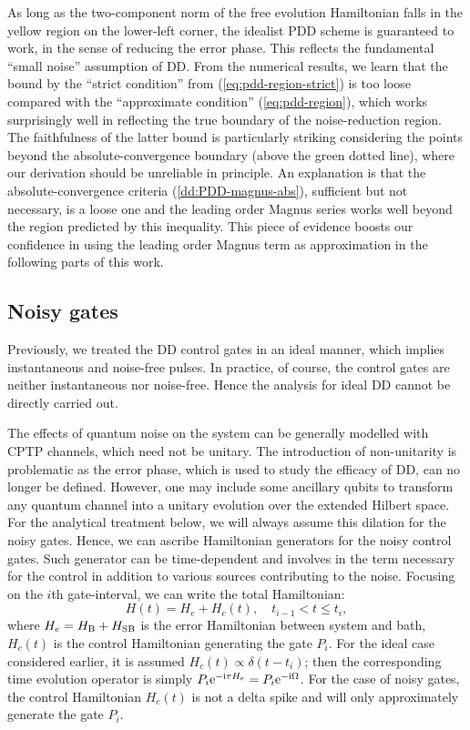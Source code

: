\documentclass[pra,reprint,superscriptaddress]{revtex4-2}
\begin{document}
{As long as the two-component norm of the free evolution Hamiltonian falls in the yellow region on the lower-left corner, the idealist PDD scheme is guaranteed to work, in the sense of reducing the error phase. This reflects the fundamental ``small noise'' assumption of DD. From the numerical results, we learn that the bound by the ``strict condition'' from (\ref{eq:pdd-region-strict}) is too loose compared with the ``approximate condition'' (\ref{eq:pdd-region}), which works surprisingly well in reflecting the true boundary of the noise-reduction region. The faithfulness of the latter bound is particularly striking considering the points beyond the absolute-convergence boundary (above the green dotted line), where our derivation should be unreliable in principle. An explanation is that the absolute-convergence criteria (\ref{dd:PDD-magnus-abs}), sufficient but not necessary, is a loose one and the leading order Magnus series works well beyond the region predicted by this inequality. This piece of evidence boosts our confidence in using the leading order Magnus term as approximation in the following parts of this work. 
}



\subsection{Noisy gates}
Previously, we treated the DD control gates in an ideal manner, which implies instantaneous and noise-free pulses. In practice, of course, the control gates are neither instantaneous nor noise-free. Hence the analysis for ideal DD cannot be directly carried out.

The effects of quantum noise on the system can be generally modelled with CPTP channels, which need not be unitary. The introduction of non-unitarity is problematic as the error phase, which is used to study the efficacy of DD, can no longer be defined.
However, one may include some ancillary qubits to transform any quantum channel into a unitary evolution over the extended Hilbert space. For the analytical treatment below, we will always assume this dilation for the noisy gates. Hence, we can ascribe Hamiltonian generators for the noisy control gates. 
Such generator can be time-dependent and involves in the term necessary for the control in addition to various sources contributing to the noise. 
Focusing on the $i$th gate-interval,  we can write the total Hamiltonian:
\begin{equation}\label{eq:noisy-Hamiltonian}
 H(t) = H_e + H_c(t), \quad t_{i-1}< t \le t_i,
\end{equation}
where $H_e=H_{\mathrm{B}}+H_{\mathrm{SB}}$ is the error Hamiltonian between system and bath, $H_c(t)$ is the control Hamiltonian generating the gate $P_i$.
For the ideal case considered earlier, it is assumed $H_c(t) \propto \delta(t-t_i)$; then the corresponding time evolution operator is simply $P_i \mathrm{e}^{-\mathrm{i} \tau H_e} =P_i \mathrm{e}^{-\mathrm{i} \Omega}$. For the case of noisy gates, the control Hamiltonian $H_c(t)$ is not a delta spike and will only approximately generate the gate $P_i$.
\end{document}
